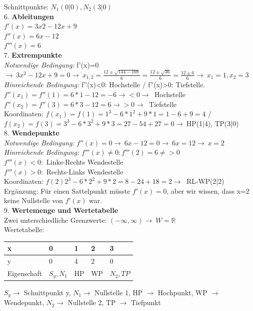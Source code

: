 \documentclass{article}
\newcommand{\R}{\mathbb{R}}
\begin{document}
	Schnittpunkte: $N_1(0|0), N_2(3|0)$ \\
	6. \textbf{Ableitungen} \\
	$f'(x)=3x2-12x+9$ \\
	$f''(x)=6x-12$ \\
	$f'''(x)=6$ \\
	7. \textbf{Extrempunkte} \\
	\textit{Notwendige Bedingung:} f'(x)=0 $\to\ 3x^2-12x+9=0\to\ x_{1,2}=\frac{12\pm\sqrt{144-108}}{6}=\frac{12\pm\sqrt{36}}{6}=\frac{12\pm6}{6}\to\ x_1=1, x_2=3$ \\
	\textit{Hinreichende Bedingung:} f''(x)<0: Hochstelle / f''(x)>0: Tiefstelle. \\
	$f''(x_1)=f''(1)=6*1-12=-6\to <0 \to\ $ Hochstelle \\
	$f''(x_2)=f''(3)=6*3-12=6\to >0\to\ $ Tiefstelle \\
	Koordinaten: $f(x_1)=f(1)=1^3-6*1^2+9*1=1-6+9=4$ / $f(x_2)=f(3)=3^3-6*3^2+9*3=27-54+27=0 \to\ $HP(1|4), TP(3|0) \\
	8. \textbf{Wendepunkte} \\
	\textit{Notwendige Bedingung:} $f''(x)=0\to\ 6x-12=0\to\ 6x=12\to\ x=2$ \\
	\textit{Hinreichende Bedingung:} $f'''(x)\ne0:f'''(2)=6\ne>0$ \\
	$f'''(x)<0:$ Links-Rechts Wendestelle \\
	$f'''(x)>0:$ Rechts-Links Wendestelle \\
	Koordinaten: $f(2)2^3-6*2^2+9*2=8-24+18=2\to\ $ RL-WP(2|2) \\
	Ergänzung: Für einen Sattelpunkt müsste $f'(x)=0$, aber wir wissen, dass x=2 keine Nullstelle von $f'(x)$ war. \\
	9. \textbf{Wertemenge und Wertetabelle} \\
	Zwei unterschiedliche Grenzwerte: $(-\infty, \infty)\to\ W=\R$ \\
	Wertetabelle: \\
	\begin{center}
	\begin{tabular}{| l | l | l | l | l |}
		\toprule
		x & 0 & 1 & 2 & 3 \\ \hline
		y & 0 & 4 & 2 & 0\\ \hline
		Eigenschaft & $S_y, N_1$ & HP & WP & $N_2, TP$ \\
		\bottomrule
	\end{tabular}
	\end{center}
	$S_y\to$ Schnittpunkt y, $N_1\to $ Nullstelle 1, HP $\to$ Hochpunkt, WP $\to$ Wendepunkt, $N_2\to$ Nullstelle 2, TP $\to$ Tiefpunkt \\
\end{document}
